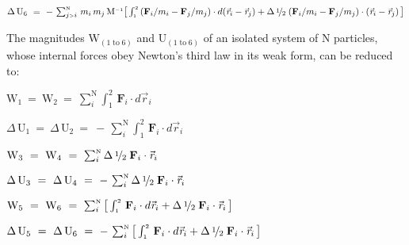 \documentclass[10pt]{article}
\newcommand{\med}{\raise.5ex\hbox{$\scriptstyle 1$}\kern-.15em/\kern-.09em\lower.25ex\hbox{$\scriptstyle 2$}}
\begin{document}
\par \bigskip\smallskip \noindent $\Delta \, {\mathrm{U}}_6 ~=~ - \, \sum_{j{\scriptscriptstyle >}i}^{\scriptscriptstyle{\mathrm{N}}} \, m_i \, m_j \, {\mathrm{M}}^{\scriptscriptstyle -1} \big [ \int_{\scriptscriptstyle 1}^{\scriptscriptstyle 2} \, ({\mathbf{F}}_i / m_i - {\mathbf{F}}_j / m_j) \cdot d({\vec{\mathit{r}}_{i}} - {\vec{\mathit{r}}_{j}}) + \Delta \, \med \; ({\mathbf{F}}_i / m_i - {\mathbf{F}}_j / m_j) \cdot ({\vec{\mathit{r}}_{i}} - {\vec{\mathit{r}}_{j}}) \, \big ]$

\par \bigskip\bigskip \noindent The magnitudes ${\mathrm{W}}_{(1\;{\mathrm{to}}\;6)}$ and ${\mathrm{U}}_{(1\;{\mathrm{to}}\;6)}$ of an isolated system of N particles, whose internal forces obey Newton's third law in its weak form, can be reduced to:

\par \bigskip\bigskip \noindent ${\mathrm{W}}_1 ~=~ {\mathrm{W}}_2 ~=~ \sum_i^{\scriptscriptstyle{\mathrm{N}}} \int_{\scriptscriptstyle 1}^{\scriptscriptstyle 2} \, {\mathbf{F}}_i \cdot d{\vec{\mathit{r}}_{i}}$

\par \bigskip\smallskip \noindent $\Delta \, {\mathrm{U}}_1 ~=~ \Delta \, {\mathrm{U}}_2 ~=~ - \, \sum_i^{\scriptscriptstyle{\mathrm{N}}} \int_{\scriptscriptstyle 1}^{\scriptscriptstyle 2} \, {\mathbf{F}}_i \cdot d{\vec{\mathit{r}}_{i}}$

\par \bigskip\bigskip \noindent ${\mathrm{W}}_3 ~=~ {\mathrm{W}}_4 ~=~ \sum_i^{\scriptscriptstyle{\mathrm{N}}} \Delta \, \med \; {\mathbf{F}}_i \cdot {\vec{\mathit{r}}_{i}}$

\par \bigskip\smallskip \noindent $\Delta \, {\mathrm{U}}_3 ~=~ \Delta \, {\mathrm{U}}_4 ~=~ - \, \sum_i^{\scriptscriptstyle{\mathrm{N}}} \Delta \, \med \; {\mathbf{F}}_i \cdot {\vec{\mathit{r}}_{i}}$

\par \bigskip\bigskip \noindent ${\mathrm{W}}_5 ~=~ {\mathrm{W}}_6 ~=~ \sum_i^{\scriptscriptstyle{\mathrm{N}}} \big [ \int_{\scriptscriptstyle 1}^{\scriptscriptstyle 2} \, {\mathbf{F}}_i \cdot d{\vec{\mathit{r}}_{i}} + \Delta \, \med \; {\mathbf{F}}_i \cdot {\vec{\mathit{r}}_{i}} \, \big ]$

\par \bigskip\smallskip \noindent $\Delta \, {\mathrm{U}}_5 ~=~ \Delta \, {\mathrm{U}}_6 ~=~ - \, \sum_i^{\scriptscriptstyle{\mathrm{N}}} \big [ \int_{\scriptscriptstyle 1}^{\scriptscriptstyle 2} \, {\mathbf{F}}_i \cdot d{\vec{\mathit{r}}_{i}} + \Delta \, \med \; {\mathbf{F}}_i \cdot {\vec{\mathit{r}}_{i}} \, \big ]$
\end{document}
